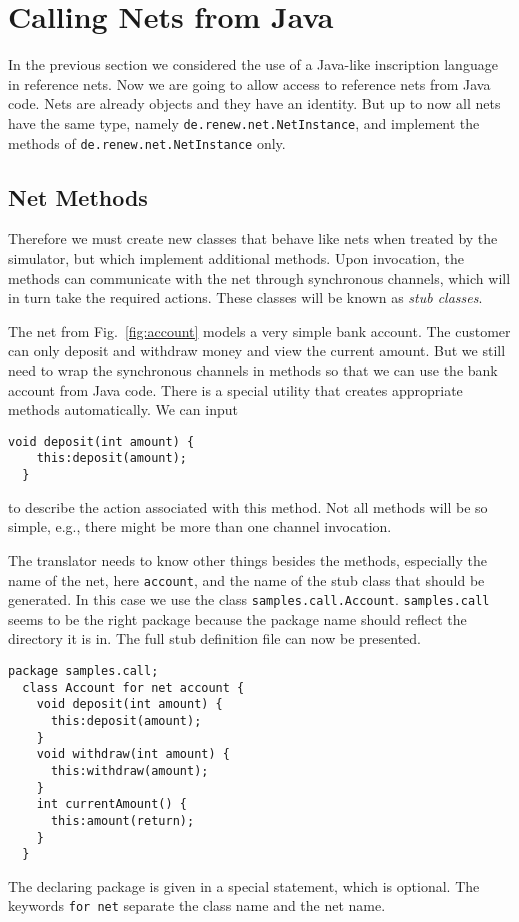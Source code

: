 \section{Calling Nets from Java}
\label{sec:netcall}

In the previous section we considered the use of a Java-like
inscription language in reference nets. Now we are going to
allow access to reference nets from Java code.
Nets are already objects and they have an identity.
But up to now all nets have the same type,
namely \texttt{de.renew.net.NetInstance}, and implement
the methods of \texttt{de.renew.net.NetInstance} only.


\subsection{Net Methods}
\label{subsec:netmethods}

Therefore we must create new classes that behave like nets when
treated by the simulator, but which implement additional methods.
Upon invocation, the methods can communicate with the net
through synchronous channels, which will in turn take
the required actions. These classes will be known as \emph{stub classes}.


The net from Fig.~\ref{fig:account} models a very simple
bank account. The customer can only deposit and withdraw money and
view the current amount. But we still need to wrap the synchronous
channels in methods so that we can use the bank account from Java
code.  There is a special utility that creates appropriate methods
automatically. We can input
\begin{lstlisting}[style=xnonfloating]
  void deposit(int amount) {
    this:deposit(amount);
  }
\end{lstlisting}
to describe the action associated with this method.
Not all methods will be so simple, e.g., there might be more than
one channel invocation.

The translator needs to know
other things besides the methods, especially the name of the net,
here \texttt{account},
and the name of the stub class that should be generated.
In this case we use the class \texttt{samples.call.Account}. 
\texttt{samples.call} seems to be the right package because the
package name should reflect the directory it is in. The full stub definition
file can now be presented.
\begin{lstlisting}[style=xnonfloating]
  package samples.call;
  class Account for net account {
    void deposit(int amount) {
      this:deposit(amount);
    }
    void withdraw(int amount) {
      this:withdraw(amount);
    }
    int currentAmount() {
      this:amount(return);
    }
  }
\end{lstlisting}
The declaring package is given in a special statement, which is optional.
The keywords \texttt{for net} separate the class name and the
net name.

